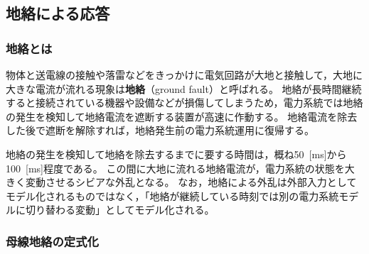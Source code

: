 \documentclass[tombow,dvipdfmx]{corona-a5-1.1}
\begin{document}
\subsection{地絡による応答}

\smallskip
\subsubsection{地絡とは}

物体と送電線の接触や落雷などをきっかけに電気回路が大地と接触して，大地に大きな電流が流れる現象は\textbf{地絡}（ground fault）と呼ばれる。
地絡が長時間継続すると接続されている機器や設備などが損傷してしまうため，電力系統では地絡の発生を検知して地絡電流を遮断する装置が高速に作動する。
地絡電流を除去した後で遮断を解除すれば，地絡発生前の電力系統運用に復帰する。

地絡の発生を検知して地絡を除去するまでに要する時間は，概ね50~[ms]から100~[ms]程度である。
この間に大地に流れる地絡電流が，電力系統の状態を大きく変動させるシビアな外乱となる。
なお，地絡による外乱は外部入力としてモデル化されるものではなく，「地絡が継続している時刻では別の電力系統モデルに切り替わる変動」としてモデル化される。

\smallskip
\subsubsection{母線地絡の定式化}
\end{document}
